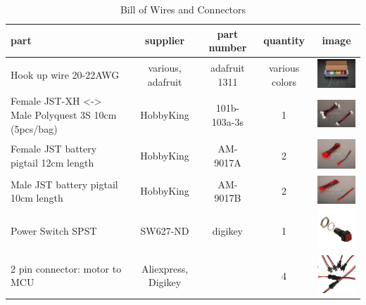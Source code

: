 \documentclass[12pt,titlepage,oneside]{memoir}
\begin{document}
\begin{table}[!h]
\begin{tabular}{p{5cm} | c | c | c | c}
part & supplier & part number & quantity & image \\
\hline
Hook up wire 20-22AWG & various, adafruit & adafruit 1311 & various colors & \includegraphics[width=80px]{picture/wires.jpg}\\
Female JST-XH <-> Male Polyquest 3S 10cm (5pcs/bag) & HobbyKing & 101b-103a-3s & 1 & \includegraphics[width=80px]{picture/jstext.jpg}\\
Female JST battery pigtail 12cm length & HobbyKing & AM-9017A & 2 & \includegraphics[width=80px]{picture/fjst.jpg}\\
Male JST battery pigtail 10cm length & HobbyKing & AM-9017B & 2 & \includegraphics[width=80px]{picture/mjst.jpg}\\
Power Switch SPST & SW627-ND & digikey & 1 & \includegraphics[width=80px]{picture/pwr.jpg}\\
2 pin connector: motor to MCU & Aliexpress, Digikey & & 4 & \includegraphics[width=80px]{picture/2pinconn.png}\\

\end{tabular}
\caption{Bill of Wires and Connectors}
\label{table:wires}
\end{table}
\end{document}
